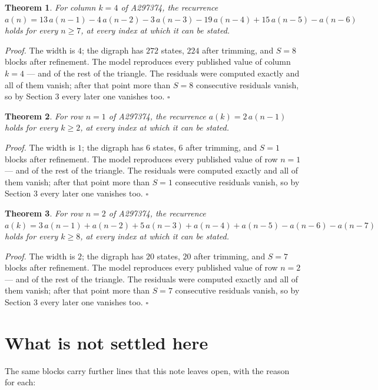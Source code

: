 \documentclass[11pt]{article}
\newtheorem{theorem}{Theorem}
\theoremstyle{definition}
\begin{document}
\begin{theorem} For column $k = 4$ of A297374, the recurrence $a(n) = 13\,a(n-1) - 4\,a(n-2) - 3\,a(n-3) - 19\,a(n-4) + 15\,a(n-5) - a(n-6)$ holds for every $n \ge 7$, at every index at which it can be stated.\end{theorem}

{\itshape Proof.} The width is $4$; the digraph has $272$ states, $224$ after trimming, and $S = 8$ blocks after refinement. The model reproduces every published value of column $k = 4$ --- and of the rest of the triangle. The residuals were computed exactly and all of them vanish; after that point more than $S = 8$ consecutive residuals vanish, so by Section 3 every later one vanishes too. $\square$

\begin{theorem} For row $n = 1$ of A297374, the recurrence $a(k) = 2\,a(n-1)$ holds for every $k \ge 2$, at every index at which it can be stated.\end{theorem}

{\itshape Proof.} The width is $1$; the digraph has $6$ states, $6$ after trimming, and $S = 1$ blocks after refinement. The model reproduces every published value of row $n = 1$ --- and of the rest of the triangle. The residuals were computed exactly and all of them vanish; after that point more than $S = 1$ consecutive residuals vanish, so by Section 3 every later one vanishes too. $\square$

\begin{theorem} For row $n = 2$ of A297374, the recurrence $a(k) = 3\,a(n-1) + a(n-2) + 5\,a(n-3) + a(n-4) + a(n-5) - a(n-6) - a(n-7)$ holds for every $k \ge 8$, at every index at which it can be stated.\end{theorem}

{\itshape Proof.} The width is $2$; the digraph has $20$ states, $20$ after trimming, and $S = 7$ blocks after refinement. The model reproduces every published value of row $n = 2$ --- and of the rest of the triangle. The residuals were computed exactly and all of them vanish; after that point more than $S = 7$ consecutive residuals vanish, so by Section 3 every later one vanishes too. $\square$

\section{What is not settled here}

The same blocks carry further lines that this note leaves open, with the reason for each:
\end{document}
